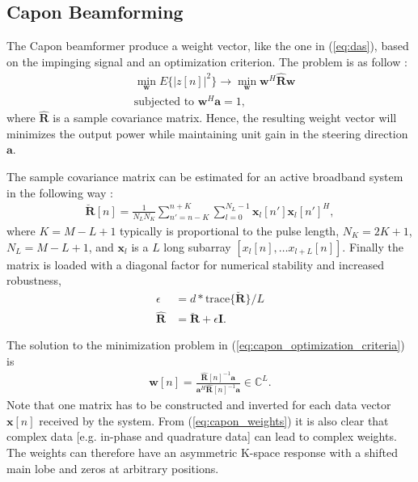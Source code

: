 \documentclass[journal]{IEEEtran}
\newcommand{\mat}[1]{\mathbf{#1}}
\renewcommand{\vec}[1]{\mathbf{#1}}
\begin{document}
\subsection{Capon Beamforming}
The Capon beamformer produce a weight vector, like the one in (\ref{eq:das}), based on the impinging signal and an optimization criterion. The problem is as follow \cite{Capon1969}:
\begin{align}
&\min_{\vec{w}} E\{|z[n]|^2\} \rightarrow \min_{\vec{w}} \vec{w}^H \mat{\hat{R}} \vec{w} \label{eq:capon_optimization_criteria} \\
&\text{subjected to } \vec{w}^H\vec{a} = 1,
\end{align}
where $\mat{\hat{R}}$ is a sample covariance matrix. Hence, the resulting weight vector will minimizes the output power while maintaining unit gain in the steering direction $\vec{a}$. %

The sample covariance matrix can be estimated for an active broadband system in the following way \cite{Synnevag2009}:
\begin{align}
\mat{\breve{R}}[n] = \frac{1}{N_LN_K}\sum_{n'=n-K}^{n+K} \sum_{l=0}^{N_L-1} \vec{x}_l[n']\vec{x}_l[n']^H,
\end{align}
where $K = M-L+1$ typically is proportional to the pulse length, $N_K = 2K + 1$, $N_L = M-L+1$, and $\vec{x}_l$ is a $L$ long subarray $[x_l[n], \dotso x_{l+L}[n]]$. Finally the matrix is loaded with a diagonal factor for numerical stability and increased robustness, 
\begin{align}
\epsilon &= d*\text{trace}\{\mat{\breve{R}}\}/L\\
\mat{\hat{R}} &= \mat{\breve{R}} + \epsilon\mat{I}.
\end{align} 

The solution to the minimization problem in (\ref{eq:capon_optimization_criteria}) is
\begin{align}\label{eq:capon_weights}
\vec{w}[n] = \frac{\mat{\hat{R}}[n]^{-1}\vec{a}}{\vec{a}^H\mat{\hat{R}}[n]^{-1}\vec{a}} \in \mathbb{C}^L.
\end{align}
Note that one matrix has to be constructed and inverted for each data vector $\vec{x}[n]$ received by the system. %
From (\ref{eq:capon_weights}) it is also clear that complex data [e.g. in-phase and quadrature data] can lead to complex weights. The weights can therefore have an asymmetric K-space response with a shifted main lobe and zeros at arbitrary positions. %
\end{document}
